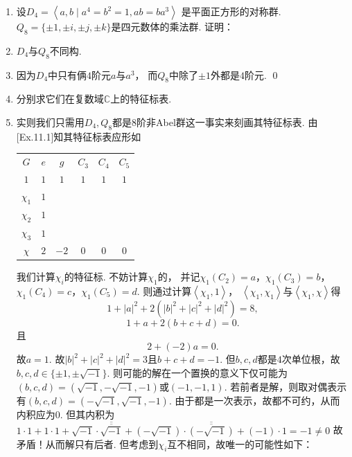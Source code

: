 \begin{enumerate}
        \item[11.2]
        设$D_{4}=\left< a,b \mid a^{4}=b^{2}=1,ab=ba^{3} \right>$
        是平面正方形的对称群.
        $Q_{8}=\{\pm 1, \pm i, \pm j, \pm k\}$是四元数体的乘法群. 证明：
        \item[(i)] $D_{4}$与$Q_{8}$不同构.
        \item[\textbf{证明:}]
            因为$D_{4}$中只有俩$4$阶元$a$与$a^{3}$，
            而$Q_{8}$中除了$\pm 1$外都是$4$阶元. \qed
        \item[(ii)] 分别求它们在复数域$\mathbb{C}$上的特征标表.
        \item[\textbf{证明:}] 
            实则我们只需用$D_{4},Q_{8}$都是$8$阶非Abel群这一事实来刻画其特征标表.
            由[Ex.11.1]知其特征标表应形如
    \begin{center}
    \begin{tabular}{|c|c|c|c|c|c|}
        $G$ & $e$ & $g$ & $C_{3}$ & $C_{4}$ & $C_{5}$ \\ 
        $1$ & $1$ & $1$ & $1$ & $1$ & $1$ \\ 
        $\chi_{1}$ & $1$ & & & & \\ 
        $\chi_{2}$ & $1$ & & & & \\ 
        $\chi_{3}$ & $1$ & & & & \\ 
        $\chi$ & $2$ & $-2$ & $0$ & $0$ & $0$
    \end{tabular}
    \end{center}
            我们计算$\chi_{i}$的特征标. 不妨计算$\chi_{1}$的，
            并记$\chi_{1}(C_{2})=a$，$\chi_{1}(C_{3})=b$，
            $\chi_{1}(C_{4})=c$，$\chi_{1}(C_{5})=d$.
            则通过计算$\left<\chi_{1},1\right>$，
            $\left<\chi_{1},\chi_{1}\right>$与$\left<\chi_{1},\chi\right>$得
            \[1+|a|^{2}+2(|b|^{2}+|c|^{2}+|d|^{2})=8,\]
            \[1+a+2(b+c+d)=0.\]
            且
            \[2+(-2)a=0.\]
            故$a=1$. 故$|b|^{2}+|c|^{2}+|d|^{2}=3$且$b+c+d=-1$.
            但$b,c,d$都是$4$次单位根，故$b,c,d \in \{\pm 1,\pm\sqrt{-1}\}$.
            则可能的解在一个置换的意义下仅可能为
            $(b,c,d)=(\sqrt{-1},-\sqrt{-1},-1)$或$(-1,-1,1)$.
            若前者是解，则取对偶表示有$(b,c,d)=(-\sqrt{-1},\sqrt{-1},-1)$.
            由于都是一次表示，故都不可约，从而内积应为$0$.
            但其内积为$1 \cdot 1 + 1 \cdot 1 + \sqrt{-1}\cdot\overline{\overline{\sqrt{-1}}} +
            (-\sqrt{-1})\cdot\overline{\overline{(-\sqrt{-1})}} + (-1) \cdot 1 = -1 \neq 0$
            故矛盾！从而解只有后者. 但考虑到$\chi_{i}$互不相同，故唯一的可能性如下：
    \begin{center}

\end{center}
\end{enumerate}
